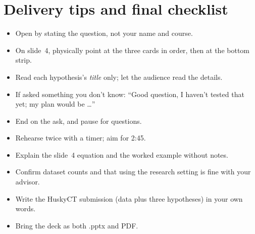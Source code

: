 \documentclass[11pt]{article}
\begin{document}
\section{Delivery tips and final checklist}
\begin{itemize}
  \item Open by stating the question, not your name and course.
  \item On slide~4, physically point at the three cards in order, then at the bottom strip.
  \item Read each hypothesis's \emph{title} only; let the audience read the details.
  \item If asked something you don't know: ``Good question, I haven't tested that yet; my
        plan would be \ldots''
  \item End on the ask, and pause for questions.
\end{itemize}
\begin{itemize}
  \item[$\square$] Rehearse twice with a timer; aim for 2:45.
  \item[$\square$] Explain the slide~4 equation and the worked example without notes.
  \item[$\square$] Confirm dataset counts and that using the research setting is fine with
        your advisor.
  \item[$\square$] Write the HuskyCT submission (data plus three hypotheses) in your own words.
  \item[$\square$] Bring the deck as both .pptx and PDF.
\end{itemize}
\end{document}
